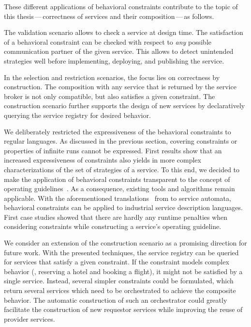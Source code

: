 These different applications of behavioral constraints contribute to the topic of this thesis\,---\,correctness of services and their composition\,---\,as follows.
\begin{niceitemize}
\item The validation scenario allows to check a service at design time. The satisfaction of a behavioral constraint can be checked with respect to \emph{any} possible communication partner of the given service. This allows to detect unintended strategies well before implementing, deploying, and publishing the service.

\item In the selection and restriction scenarios, the focus lies on correctness by construction. The composition with any service that is returned by the service broker is not only compatible, but also satisfies a given constraint. The construction scenario further supports the design of new services by declaratively querying the service registry for desired behavior.
\end{niceitemize}

We deliberately restricted the expressiveness of the behavioral constraints to regular languages. As discussed in the previous section, covering constraints or properties of infinite runs cannot be expressed. First results show that an increased expressiveness of constraints also yields in more complex characterizations of the set of strategies of a service. To this end, we decided to make the application of behavioral constraints transparent to the concept of operating guidelines~\cite{StahlW_2008_bpm,KaschnerW_2009_bpm}. As a consequence, existing tools and algorithms remain applicable. With the aforementioned translations~\cite{LohmannMSW_2006_bpm,Lohmann_2007_wsfm} from  to service automata, behavioral constraints can be applied to industrial service description languages. First case studies showed that there are hardly any runtime penalties when considering constraints while constructing a service's operating guideline.

We consider an extension of the construction scenario as a promising direction for future work. With the presented techniques, the service registry can be queried for services that satisfy a given constraint. If the constraint models complex behavior (\eg, reserving a hotel and booking a flight), it might not be satisfied by a single service. Instead, several simpler constraints could be formulated, which return several services which need to be orchestrated to achieve the composite behavior. The automatic construction of such an orchestrator could greatly facilitate the construction of new requestor services while improving the reuse of provider services.
